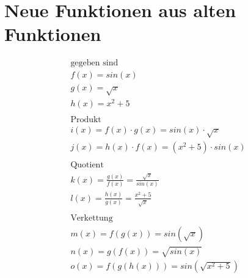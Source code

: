 \section{Neue Funktionen aus alten Funktionen}
\begin{gather*}
  \text{gegeben sind} \\
  f(x) = sin(x) \\
  g(x) = \sqrt{x} \\
  h(x) = x^2 + 5 \\\\
  \text{Produkt} \\
  i(x) = f(x) \cdot g(x) = sin(x) \cdot \sqrt{x} \\
  j(x) = h(x) \cdot f(x) = (x^2 + 5) \cdot sin(x) \\\\
  \text{Quotient} \\
  k(x) = \frac{g(x)}{f(x)} = \frac{\sqrt{x}}{sin(x)} \\
  l(x) = \frac{h(x)}{g(x)} = \frac{x^2 + 5}{\sqrt{x}} \\\\
  \text{Verkettung} \\
  m(x) = f(g(x)) = sin(\sqrt{x}) \\
  n(x) = g(f(x)) = \sqrt{sin(x)} \\
  o(x) = f(g(h(x))) = sin(\sqrt{x^2 + 5})
\end{gather*}
